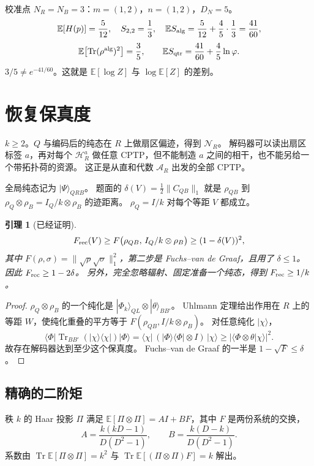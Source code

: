 \documentclass[11pt]{ctexart}
\newtheorem{lemma}[theorem]{引理}
\theoremstyle{definition}
\theoremstyle{remark}
\newcommand{\E}{\mathbb E}
\newcommand{\Tr}{\operatorname{Tr}}
\newcommand{\ph}{\varphi}
\begin{document}
校准点 $N_R=N_B=3$：$m=(1,2)$，$n=(1,2)$，$D_N=5$。
\[
\E[H(p)]=\frac{5}{12},\quad
S_{2,2}=\frac13,\quad
\E S_{\rm alg}=\frac{5}{12}+\frac45\cdot\frac13=\frac{41}{60},
\]
\[
\E\bigl[\Tr(\rho^{\rm alg})^2\bigr]=\frac35,
\qquad
\E S_{\rm qtr}=\frac{41}{60}+\frac45\ln\ph.
\]
$3/5\neq e^{-41/60}$。这就是 $\E[\log Z]$ 与 $\log\E[Z]$ 的差别。

\section{恢复保真度}
\label{sec:frec}

$k\ge 2$。$Q$ 与编码后的纯态在 $R$ 上做扇区偏迹，得到 $\mathcal N_R$。
解码器可以读出扇区标签 $a$，再对每个 $\mathcal H_R^a$ 做任意 CPTP，但不能制造 $a$ 之间的相干，也不能另给一个带拓扑荷的资源。
这正是从直和代数 $\mathcal A_R$ 出发的全部 CPTP。

全局纯态记为 $|\Psi\rangle_{QRB}$。
题面的 $\delta(V)=\frac12\|C_{QB}\|_1$ 就是 $\rho_{QB}$ 到 $\rho_Q\otimes\rho_B=I_Q/k\otimes\rho_B$ 的迹距离。
$\rho_Q=I/k$ 对每个等距 $V$ 都成立。

\begin{lemma}[已经证明]
\label{lem:fidelity}
\[
F_{\rm rec}(V)\ge F\bigl(\rho_{QB},\,I_Q/k\otimes\rho_B\bigr)\ge(1-\delta(V))^2,
\]
其中 $F(\rho,\sigma)=\bigl\|\sqrt\rho\sqrt\sigma\bigr\|_1^2$，第二步是 Fuchs--van de Graaf，且用了 $\delta\le 1$。
因此 $F_{\rm rec}\ge 1-2\delta$。
另外，完全忽略辐射、固定准备一个纯态，得到 $F_{\rm rec}\ge 1/k$。
\end{lemma}

\begin{proof}
$\rho_Q\otimes\rho_B$ 的一个纯化是 $|\Phi_k\rangle_{QL}\otimes|\theta\rangle_{BB'}$。
Uhlmann 定理给出作用在 $R$ 上的等距 $W$，使纯化重叠的平方等于 $F(\rho_{QB},I/k\otimes\rho_B)$。
对任意纯化 $|\chi\rangle$，
\[
\langle\Phi|\Tr_{BB'}(|\chi\rangle\langle\chi|)|\Phi\rangle
=\langle\chi|\,(|\Phi\rangle\langle\Phi|\otimes I)\,|\chi\rangle
\ge\bigl|\langle\Phi\otimes\theta|\chi\rangle\bigr|^2.
\]
故存在解码器达到至少这个保真度。
Fuchs--van de Graaf 的一半是 $1-\sqrt{F}\le\delta$。
\end{proof}

\subsection{精确的二阶矩}

秩 $k$ 的 Haar 投影 $\Pi$ 满足 $\E[\Pi\otimes\Pi]=AI+BF$，其中 $F$ 是两份系统的交换，
\[
A=\frac{k(kD-1)}{D(D^2-1)},\qquad
B=\frac{k(D-k)}{D(D^2-1)}.
\]
系数由 $\Tr\E[\Pi\otimes\Pi]=k^2$ 与 $\Tr\E[(\Pi\otimes\Pi)F]=k$ 解出。
\end{document}

